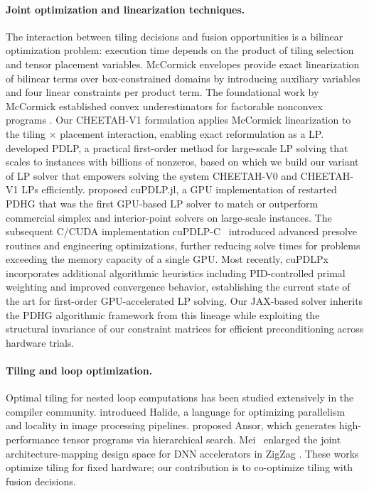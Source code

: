 \paragraph{Joint optimization and linearization techniques.}
The interaction between tiling decisions and fusion opportunities is a bilinear optimization problem: execution time depends on the product of tiling selection and tensor placement variables.
McCormick envelopes provide exact linearization of bilinear terms over box-constrained domains by introducing auxiliary variables and four linear constraints per product term.
The foundational work by McCormick established convex underestimators for factorable nonconvex programs \citep{mccormick1976computability}.
Our CHEETAH-V1 formulation applies McCormick linearization to the tiling $\times$ placement interaction, enabling exact reformulation as a LP.
\citep{applegate2022practicallargescalelinearprogramming} developed PDLP, a practical first-order method for large-scale LP solving that scales to instances with billions of nonzeros, based on which we build our variant of LP solver that empowers solving the system CHEETAH-V0 and CHEETAH-V1 LPs efficiently. \citep{lu2024cupdlpjlgpuimplementationrestarted} proposed cuPDLP.jl, a GPU implementation of restarted PDHG that was the first GPU-based LP solver to match or outperform commercial simplex and interior-point solvers on large-scale instances. The subsequent C/CUDA implementation cuPDLP-C~\citep{lu2024cupdlpcstrengthenedimplementationcupdlp} introduced advanced presolve routines and engineering optimizations, further reducing solve times for problems exceeding the memory capacity of a single GPU. Most recently, cuPDLPx \citep{lu2025cupdlpxenhancedgpubasedfirstorder} incorporates additional algorithmic heuristics including PID-controlled primal weighting and improved convergence behavior, establishing the current state of the art for first-order GPU-accelerated LP solving.  Our JAX-based solver inherits the PDHG algorithmic framework from this lineage while exploiting the structural invariance of our constraint matrices for efficient preconditioning across hardware trials.

\paragraph{Tiling and loop optimization.}
Optimal tiling for nested loop computations has been studied extensively in the compiler community.
\citep{ragan2013halide} introduced Halide, a language for optimizing parallelism and locality in image processing pipelines.
\citep{zheng2023ansorgeneratinghighperformancetensor} proposed Ansor, which generates high-performance tensor programs via hierarchical search.
Mei \etal~enlarged the joint architecture-mapping design space for DNN accelerators in ZigZag \citep{mei2021zigzag}.
These works optimize tiling for fixed hardware; our contribution is to co-optimize tiling with fusion decisions.

